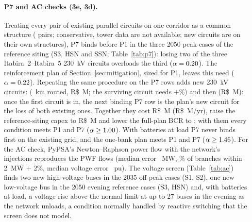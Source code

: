 \documentclass[10pt]{article}
\newcommand{\RS}{R\$}
\begin{document}
\paragraph{P7 and AC checks (3e, 3d).} Treating every pair of existing parallel circuits on one corridor as a common structure (\Npairs{} pairs;
conservative, tower data are not available; new circuits are on their own structures), P7 binds before P1 in the three 2050 peak cases of
the reference siting (S3, HSN and SSN; Table~\ref{tab:p7}): losing two of the three Itabira~2--Itabira~5 230~kV circuits overloads the third
($\alpha=0.20$). The reinforcement plan of Section~\ref{sec:mitigation}, sized for P1, leaves this need ($\alpha=0.22$). Repeating the same procedure on
the P7 rows adds \Npremn{} new 230~kV circuits: \Npremnameone{} (\Npremkmone~km routed, \RS\Npremcapexone~M; the surviving circuit needs
+\Npremincone\%) and then \Npremnametwo{} (\RS\Npremcapextwo~M): once the first circuit is in, the next binding P7 row is the plan's new
\Npremnametwo{} circuit for the loss of both existing ones. Together they cost \RS\Npremcapex~M (\RS\Npremarr~M/yr), raise the reference-siting
capex to \RS\Npremplancapex~M and lower the full-plan BCR to \Nprembcr{}; with them every condition meets P1 and P7
($\alpha\ge1.00$). With batteries at load P7 never binds first on the existing grid, and the one-bank plan meets P1 and P7
($\alpha\ge1.46$). For the AC check, PyPSA's Newton--Raphson power flow with the network's injections reproduces the PWF flows (median error \Nacmed~MW, \Nacshare\% of branches within
2~MW + 2\%, median voltage error \Nacvmed~pu). The voltage screen (Table~\ref{tab:ac}) finds two new high-voltage buses in the 2035 off-peak
cases (S1, S2), one new low-voltage bus in the 2050 evening reference cases (S3, HSN) and, with batteries at load, a voltage rise above the
normal limit at up to 27 buses in the evening as the network unloads, a condition normally handled by reactive switching that the screen
does not model.




\end{document}
